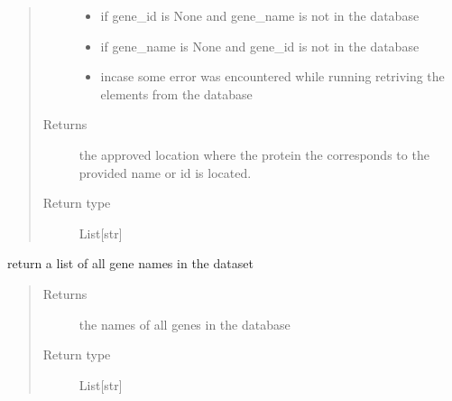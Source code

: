 \documentclass[letterpaper,10pt,english]{sphinxmanual}
\begin{document}
\begin{fulllineitems}
\begin{fulllineitems}
\begin{quote}
\begin{description}
\begin{itemize}
\item {} 
 \textendash{} if gene\_id is None and gene\_name is not in the database

\item {} 
 \textendash{} if gene\_name is None and gene\_id is not in the database

\item {} 
 \textendash{} incase some error was encountered while running retriving the elements from the database

\end{itemize}

\item[{Returns}] \leavevmode
the approved location where the protein the corresponds to the provided name or id is located.

\item[{Return type}] \leavevmode
List{[}str{]}

\end{description}\end{quote}

\end{fulllineitems}


\begin{fulllineitems}
\label{\detokenize{IPTK.Classes:IPTK.Classes.Database.CellularLocationDB.get_gene_names}}
return a list of all gene names in the dataset
\begin{quote}\begin{description}
\item[{Returns}] \leavevmode
the names of all genes in the database

\item[{Return type}] \leavevmode
List{[}str{]}

\end{description}\end{quote}

\end{fulllineitems}



\end{fulllineitems}
\end{document}
